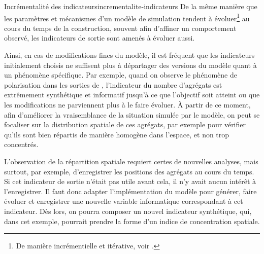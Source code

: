 \bigskip

\begin{encadre}{Incrémentalité des indicateurs}{incrementalite-indicateurs}
\renewcommand{\thempfootnote}{\alph{mpfootnote}}
De la même manière que les paramètres et mécanismes d'un modèle de simulation tendent à évoluer\footnote{
	De manière incrémentielle et itérative, voir \textcite[\url{http://itsadeliverything.com/revisiting-the-iterative-incremental-mona-lisa}]{thomas_revisiting_2012}.
} au cours du temps de la construction, souvent afin d'affiner un comportement observé, les indicateurs de sortie sont amenés à évoluer aussi.

Ainsi, en cas de modifications fines du modèle, il est fréquent que les indicateurs initialement choisis ne suffisent plus à départager des versions du modèle quant à un phénomène spécifique.
Par exemple, quand on observe le phénomène de polarisation dans les sorties de \simfeodal{}, l'indicateur du nombre d'agrégats est extrêmement synthétique et informatif jusqu'à ce que l'objectif soit atteint ou que les modifications ne parviennent plus à le faire évoluer.
À partir de ce moment, afin d'améliorer la vraisemblance de la situation simulée par le modèle, on peut se focaliser sur la distribution spatiale de ces agrégats, par exemple pour vérifier qu'ils sont bien répartis de manière homogène dans l'espace, et non trop concentrés.

L'observation de la répartition spatiale requiert certes de nouvelles analyses, mais surtout, par exemple, d'enregistrer les positions des agrégats au cours du temps.
Si cet indicateur de sortie n'était pas utile avant cela, il n'y avait aucun intérêt à l'enregistrer.
Il faut donc adapter l'implémentation du modèle pour générer, faire évoluer et enregistrer une nouvelle variable informatique correspondant à cet indicateur.
Dès lors, on pourra composer un nouvel indicateur synthétique, qui, dans cet exemple, pourrait prendre la forme d'un indice de concentration spatiale.


\end{encadre}
